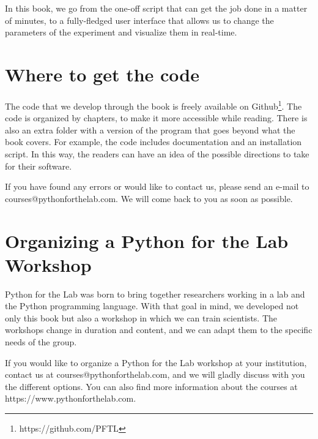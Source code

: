 In this book, we go from the one-off script that can get the job done in a matter of minutes, to a fully-fledged user interface that allows us to change the parameters of the experiment and visualize them in real-time.

\section{Where to get the code}\label{sec:where-to-get-the-code}
The code that we develop through the book is freely available on Github\footnote{https://github.com/PFTL}. The code is organized by chapters, to make it more accessible while reading. There is also an extra folder with a version of the program that goes beyond what the book covers. For example, the code includes documentation and an installation script. In this way, the readers can have an idea of the possible directions to take for their software.

If you have found any errors or would like to contact us, please send an e-mail to courses@pythonforthelab.com. We will come back to you as soon as possible.

\section{Organizing a Python for the Lab Workshop}\label{sec:organizing-a-python-for-the-lab-workshop}
Python for the Lab was born to bring together researchers working in a lab and the Python programming language. With that goal in mind, we developed not only this book but also a workshop in which we can train scientists. The workshops change in duration and content, and we can adapt them to the specific needs of the group.

If you would like to organize a Python for the Lab workshop at your institution, contact us at courses@pythonforthelab.com, and we will gladly discuss with you the different options. You can also find more information about the courses at https://www.pythonforthelab.com.
